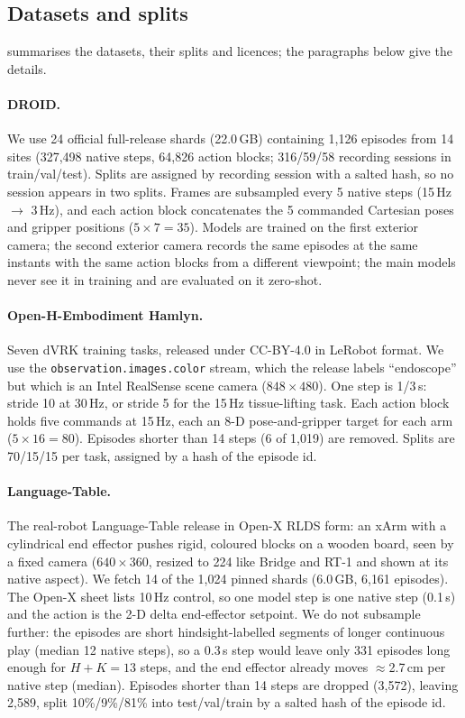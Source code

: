 \subsection{Datasets and splits}\label{app:data}
 summarises the datasets, their splits and licences; the paragraphs below give the details.

\paragraph{DROID.} We use 24 official full-release shards (22.0\,GB) containing 1{,}126 episodes from 14 sites (327{,}498 native steps, 64{,}826 action blocks; 316/59/58 recording
sessions in train/val/test). Splits are assigned by recording session with a salted hash, so no session appears in two
splits. Frames are subsampled every 5 native steps (15\,Hz $\to$ 3\,Hz), and each action block
concatenates the 5 commanded Cartesian poses and gripper positions ($5\times7{=}35$).
Models are trained on the first exterior camera; the second exterior camera records the same episodes at the same
instants with the same action blocks from a different viewpoint; the main models never see it in training and are
evaluated on it zero-shot.
\paragraph{Open-H-Embodiment Hamlyn.} Seven dVRK training tasks, released under CC-BY-4.0 in LeRobot
format. We use the \texttt{observation.images.color} stream, which the release labels ``endoscope''
but which is an Intel RealSense scene camera ($848{\times}480$). One step is 1/3\,s: stride 10 at
30\,Hz, or stride 5 for the 15\,Hz tissue-lifting task. Each action block holds five commands at
15\,Hz, each an 8-D pose-and-gripper target for each arm ($5\times16{=}80$). Episodes shorter than 14
steps (6 of 1{,}019) are removed. Splits are 70/15/15 per task, assigned by a hash of the episode id.
\paragraph{Language-Table.} The real-robot Language-Table release \citep{lynch2023interactive} in Open-X RLDS form:
an xArm with a cylindrical end effector pushes rigid, coloured blocks on a wooden board, seen by a fixed camera
($640{\times}360$, resized to 224 like Bridge and RT-1 and shown at its native aspect). We fetch 14 of the 1{,}024 pinned
shards (6.0\,GB, 6{,}161 episodes). The Open-X sheet lists 10\,Hz control, so one model step is one native step (0.1\,s)
and the action is the 2-D delta end-effector setpoint. We do not subsample further: the episodes are short
hindsight-labelled segments of longer continuous play (median 12 native steps), so a 0.3\,s step would leave only 331 episodes long enough for
$H{+}K{=}13$ steps, and the end effector already moves $\approx$2.7\,cm per native step (median). Episodes shorter than 14
steps are dropped (3{,}572), leaving 2{,}589, split 10\%/9\%/81\% into test/val/train by a salted hash of the episode id.

